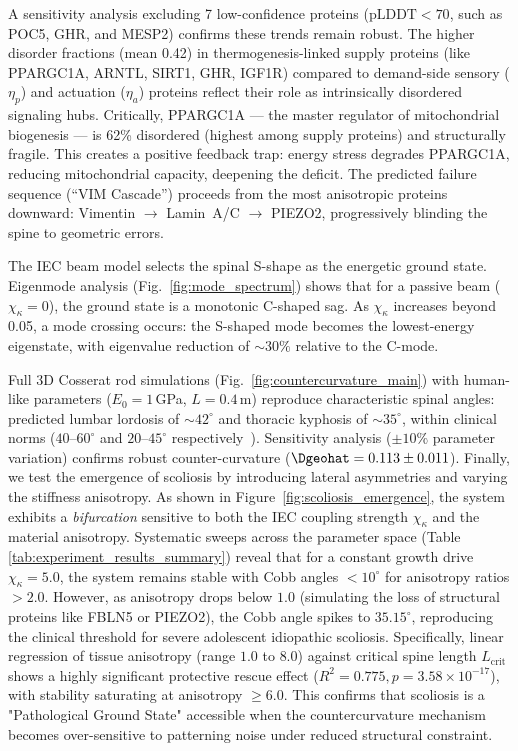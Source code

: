 \documentclass[11pt]{article}
\begin{document}
A sensitivity analysis excluding 7 low-confidence proteins ($\text{pLDDT} < 70$, such as POC5, GHR, and MESP2) confirms these trends remain robust. The higher disorder fractions (mean 0.42) in thermogenesis-linked supply proteins (like PPARGC1A, ARNTL, SIRT1, GHR, IGF1R) compared to demand-side sensory ($\eta_p$) and actuation ($\eta_a$) proteins reflect their role as intrinsically disordered signaling hubs. Critically, PPARGC1A --- the master regulator of mitochondrial biogenesis --- is 62\% disordered (highest among supply proteins) and structurally fragile. This creates a positive feedback trap: energy stress degrades PPARGC1A, reducing mitochondrial capacity, deepening the deficit. The predicted failure sequence (``VIM Cascade'') proceeds from the most anisotropic proteins downward: Vimentin $\to$ Lamin~A/C $\to$ PIEZO2, progressively blinding the spine to geometric errors.



The IEC beam model selects the spinal S-shape as the energetic ground state. Eigenmode analysis (Fig.~\ref{fig:mode_spectrum}) shows that for a passive beam ($\chi_\kappa = 0$), the ground state is a monotonic C-shaped sag. As $\chi_\kappa$ increases beyond 0.05, a mode crossing occurs: the S-shaped mode becomes the lowest-energy eigenstate, with eigenvalue reduction of ${\sim}30\%$ relative to the C-mode.

Full 3D Cosserat rod simulations (Fig.~\ref{fig:countercurvature_main}) with human-like parameters ($E_0 = 1$\,GPa, $L = 0.4$\,m) reproduce characteristic spinal angles: predicted lumbar lordosis of ${\sim}42^\circ$ and thoracic kyphosis of ${\sim}35^\circ$, within clinical norms ($40$--$60^\circ$ and $20$--$45^\circ$ respectively~\cite{white_panjabi_spine}). Sensitivity analysis ($\pm 10\%$ parameter variation) confirms robust counter-curvature ($\Dgeohat = 0.113 \pm 0.011$).
Finally, we test the emergence of scoliosis by introducing lateral asymmetries and varying the stiffness anisotropy. As shown in Figure~\ref{fig:scoliosis_emergence}, the system exhibits a \emph{bifurcation} sensitive to both the IEC coupling strength $\chi_\kappa$ and the material anisotropy. Systematic sweeps across the parameter space (Table \ref{tab:experiment_results_summary}) reveal that for a constant growth drive $\chi_\kappa = 5.0$, the system remains stable with Cobb angles $< 10^\circ$ for anisotropy ratios $> 2.0$. However, as anisotropy drops below $1.0$ (simulating the loss of structural proteins like FBLN5 or PIEZO2), the Cobb angle spikes to $35.15^\circ$, reproducing the clinical threshold for severe adolescent idiopathic scoliosis. Specifically, linear regression of tissue anisotropy (range $1.0$ to $8.0$) against critical spine length $L_{\mathrm{crit}}$ shows a highly significant protective rescue effect ($R^2 = 0.775, p = 3.58 \times 10^{-17}$), with stability saturating at anisotropy $\ge 6.0$. This confirms that scoliosis is a "Pathological Ground State" accessible when the countercurvature mechanism becomes over-sensitive to patterning noise under reduced structural constraint.
\end{document}
